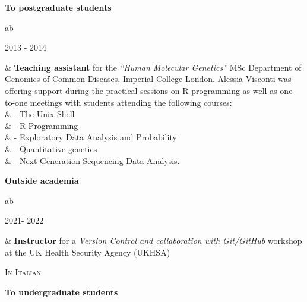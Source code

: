 \documentclass[a4paper,10pt]{article}
\newcommand{\smalltitle}[1]{
	\vspace{0.1cm}
	{\noindent 
	\large \textsc{#1}}
	\vspace{0.1cm}
}
\newenvironment{singletablelist}
{	\vspace{-0.2cm}
	\begin{longtable}[!h]{ab}}{\end{longtable}
}
\newcommand{\stlist}[2]{
	\hspace{-3cm}
	\noindent
	\begin{minipage}{0.24\textwidth}
	\begin{flushright}
	\textsc{#1}
	\end{flushright}
	\end{minipage}
	& #2\\[0.2cm]
}
\begin{document}
\vspace{0.2cm}

\noindent \textbf{To postgraduate students}

\begin{singletablelist}

	\stlist{2013 - 2014}{\textbf{Teaching assistant} for the \emph{``Human Molecular Genetics''} MSc Department of Genomics of Common Diseases, Imperial College London. Alessia Visconti was offering support during the practical sessions on R programming as well as one-to-one meetings with students attending the following courses:\\
							& \hskip1cm - The Unix Shell\\
							& \hskip1cm - R Programming\\
							& \hskip1cm - Exploratory Data Analysis and Probability\\
							& \hskip1cm - Quantitative genetics\\
							& \hskip1cm - Next Generation Sequencing Data Analysis.}				
\end{singletablelist}							

\vspace{0.2cm}

\noindent \textbf{Outside academia}


\begin{singletablelist}


\stlist{2021- 2022}{ \textbf{Instructor} for a \emph{Version Control and collaboration with Git/GitHub} workshop at the UK Health Security Agency (UKHSA)}

\end{singletablelist}


\smalltitle{In Italian}

\vspace{0.2cm}

\noindent \textbf{To undergraduate students}
\end{document}
